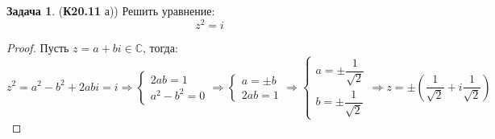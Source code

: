 \documentclass[12pt]{article}
\newcommand{\MC}{\mathbb{C}}
\theoremstyle{definition}
\newtheorem{problem}{Задача}
\begin{document}
\begin{problem}(\textbf{К20.11} а)) 
	Решить уравнение:
	$$
		z^2 = i
	$$
\end{problem}
\begin{proof}
	Пусть $z = a + bi \in \MC$, тогда:
	$$
		 z^2 = a^2  - b^2 + 2abi = i\Rightarrow 
		\begin{cases}
			2ab = 1 \\
			a^2 -b^2 = 0
		\end{cases} \Rightarrow 		
		\begin{cases}
			a = \pm b\\
			2ab = 1
		\end{cases} \Rightarrow 
		\begin{cases}
			a = \pm \dfrac{1}{\sqrt{2}}\\[10pt]
			b = \pm \dfrac{1}{\sqrt{2}}
		\end{cases} \Rightarrow z = \pm \left(\dfrac{1}{\sqrt{2}} + i \dfrac{1}{\sqrt{2}}\right)
	$$
\end{proof}
\end{document}
